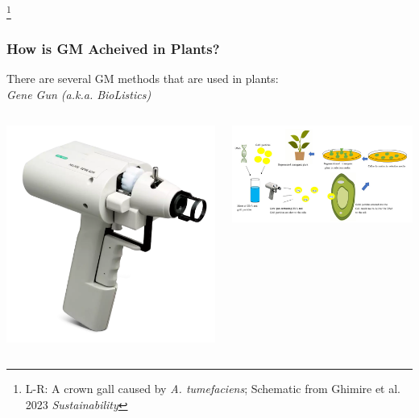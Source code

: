 \documentclass[xcolor=dvipsnames]{beamer}
\newcommand\blfootnote[1]{%
	\begingroup
	\renewcommand\thefootnote{}\footnote{#1}%
	\addtocounter{footnote}{-1}%
	\endgroup
}
\begin{document}
\begin{frame}
\begin{columns}
\begin{column}{0.8\textwidth}
		\end{column}
	\end{columns}	
		\blfootnote{L-R: A crown gall caused by \textit{A. tumefaciens}; Schematic from Ghimire et al. 2023 \textit{Sustainability}}
\end{frame}



\begin{frame}
	\frametitle{How is GM Acheived in Plants?}
	There are several GM methods that are used in plants:\\
	
	\vspace{15pt}
	\hspace{35pt} \large \textit{Gene Gun (a.k.a. BioListics)}
	\vspace{5pt}
	\centering
	\begin{columns}
		\begin{column}{0.3\textwidth}
			\includegraphics[keepaspectratio, width  = \textwidth]{img/realGeneGun}		
		\end{column}
		\begin{column}{0.8\textwidth}
			\includegraphics[keepaspectratio, width  = \textwidth]{img/geneGun}		

\end{column}
\end{columns}
\end{frame}
\end{document}
